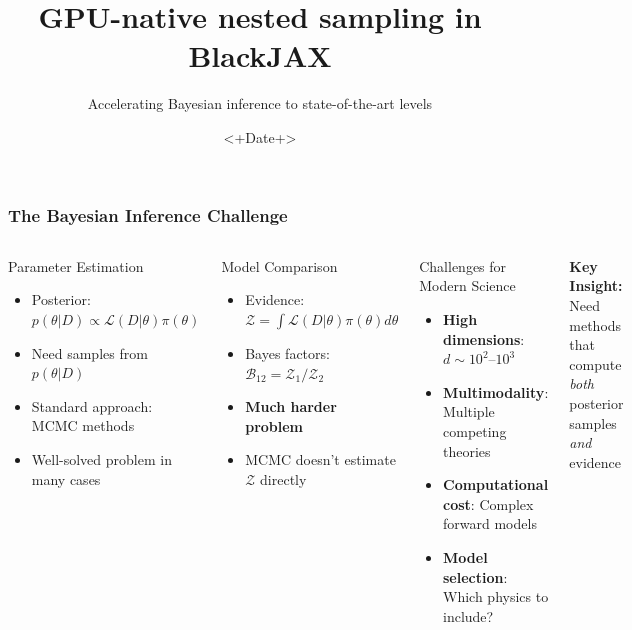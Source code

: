 \documentclass[aspectratio=169]{beamer}
\title{GPU-native nested sampling in BlackJAX}
\subtitle{Accelerating Bayesian inference to state-of-the-art levels}
\date{<+Date+>}
\begin{document}
\begin{frame}
    \titlepage
\end{frame}

\begin{frame}
    \frametitle{The Bayesian Inference Challenge}
    \begin{columns}
        \begin{block}{Parameter Estimation}
            \begin{itemize}
                \item Posterior: $p(\theta|D) \propto \mathcal{L}(D|\theta) \pi(\theta)$
                \item Need samples from $p(\theta|D)$
                \item Standard approach: MCMC methods
                \item Well-solved problem in many cases
            \end{itemize}
        \end{block}
        \begin{block}{Model Comparison}
            \begin{itemize}
                \item Evidence: $\mathcal{Z} = \int \mathcal{L}(D|\theta) \pi(\theta) d\theta$
                \item Bayes factors: $\mathcal{B}_{12} = \mathcal{Z}_1 / \mathcal{Z}_2$
                \item \textbf{Much harder problem}
                \item MCMC doesn't estimate $\mathcal{Z}$ directly
            \end{itemize}
        \end{block}
        \begin{block}{Challenges for Modern Science}
            \begin{itemize}
                \item \textbf{High dimensions}: $d \sim 10^2$--$10^3$
                \item \textbf{Multimodality}: Multiple competing theories
                \item \textbf{Computational cost}: Complex forward models
                \item \textbf{Model selection}: Which physics to include?
            \end{itemize}
        \end{block}
        \vspace{10pt}
        \begin{center}
            \textbf{Key Insight:}\\
            Need methods that compute \emph{both} \\
            posterior samples \emph{and} evidence
        \end{center}
    \end{columns}
\end{frame}
\end{document}

